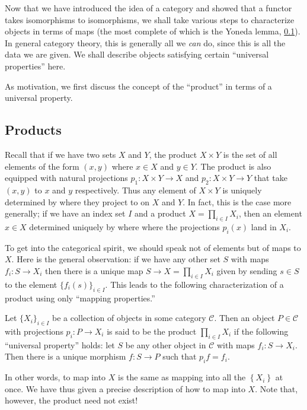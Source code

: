 Now that we have introduced the idea of a category and showed that a functor
takes isomorphisms to isomorphisms, we shall take various steps to characterize objects in terms of
maps (the most complete of which is the Yoneda lemma, \cref{}). In
general category
theory, this is generally all we \emph{can} do, since this is all the data we
are given.
We shall describe objects satisfying certain ``universal properties'' here.


As motivation, we first discuss the concept of the ``product'' in terms of a
universal property.

\subsection{Products}
Recall that if we have two sets $X$ and $Y$, the product $X\times Y$ is the set
of all elements of the form $(x,y)$ where $x\in X$ and $y\in Y$. The product is
also equipped with natural projections $p_1: X \times Y \to X$ and $p_2: X
\times Y \to Y$ that take $(x,y)$ to $x$
and $y$ respectively. Thus any element of $X\times Y$ is uniquely determined by
where they project to on $X$ and $Y$. In fact, this is the case more generally; if
we have an index set $I$ and a product $X=\prod_{i\in I} X_i$, then an element
$x\in X$ determined uniquely by where where the projections $p_i(x)$ land in
$X_i$. 

To get into the categorical spirit, we should speak not of elements but of maps
to $X$. Here is the general observation: if we have any other set $S$ with maps
$f_i:S\rightarrow X_i$ then there is a unique map $S\rightarrow X=\prod_{i\in
I}X_i$ given by sending $s\in S$ to the element $\{ f_i(s)\}_{i\in I}$. This
leads to the following characterization of a product using only ``mapping
properties.''

\begin{definition} Let $\{X_i\}_{i\in I}$ be a collection of objects in some
category $\mathcal{C}$. Then an object $P \in \mathcal{C}$ with projections $p_i: P\rightarrow X_i$
is said to be the product $\prod_{i\in I} X_i$ if the following ``universal
property'' holds:
let $S$ be any other object in $\mathcal{C}$ with maps $f_i:S\rightarrow X_i$.
Then there is a unique morphism $f:S\rightarrow P$ such that $p_i f = f_i$.
\end{definition}

In other words, to map into $X$ is the same as mapping into all the
$\left\{X_i\right\}$ at once. We have thus given a precise description of how
to map into $X$.
Note that, however, the product need not exist! 

